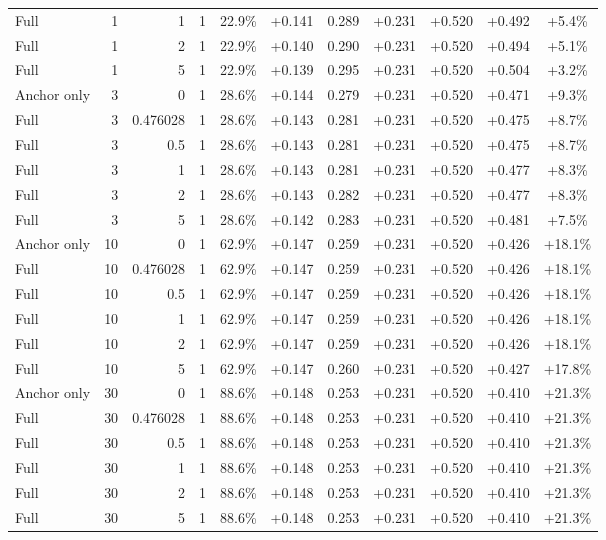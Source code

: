 \begin{table}[htbp]
\begin{tabular}{lrrrccccccc}
Full & 1 & 1 & 1 & 22.9\% & +0.141 & 0.289 & +0.231 & +0.520 & +0.492 & +5.4\% \\
Full & 1 & 2 & 1 & 22.9\% & +0.140 & 0.290 & +0.231 & +0.520 & +0.494 & +5.1\% \\
Full & 1 & 5 & 1 & 22.9\% & +0.139 & 0.295 & +0.231 & +0.520 & +0.504 & +3.2\% \\
Anchor only & 3 & 0 & 1 & 28.6\% & +0.144 & 0.279 & +0.231 & +0.520 & +0.471 & +9.3\% \\
Full & 3 & 0.476028 & 1 & 28.6\% & +0.143 & 0.281 & +0.231 & +0.520 & +0.475 & +8.7\% \\
Full & 3 & 0.5 & 1 & 28.6\% & +0.143 & 0.281 & +0.231 & +0.520 & +0.475 & +8.7\% \\
Full & 3 & 1 & 1 & 28.6\% & +0.143 & 0.281 & +0.231 & +0.520 & +0.477 & +8.3\% \\
Full & 3 & 2 & 1 & 28.6\% & +0.143 & 0.282 & +0.231 & +0.520 & +0.477 & +8.3\% \\
Full & 3 & 5 & 1 & 28.6\% & +0.142 & 0.283 & +0.231 & +0.520 & +0.481 & +7.5\% \\
Anchor only & 10 & 0 & 1 & 62.9\% & +0.147 & 0.259 & +0.231 & +0.520 & +0.426 & +18.1\% \\
Full & 10 & 0.476028 & 1 & 62.9\% & +0.147 & 0.259 & +0.231 & +0.520 & +0.426 & +18.1\% \\
Full & 10 & 0.5 & 1 & 62.9\% & +0.147 & 0.259 & +0.231 & +0.520 & +0.426 & +18.1\% \\
Full & 10 & 1 & 1 & 62.9\% & +0.147 & 0.259 & +0.231 & +0.520 & +0.426 & +18.1\% \\
Full & 10 & 2 & 1 & 62.9\% & +0.147 & 0.259 & +0.231 & +0.520 & +0.426 & +18.1\% \\
Full & 10 & 5 & 1 & 62.9\% & +0.147 & 0.260 & +0.231 & +0.520 & +0.427 & +17.8\% \\
Anchor only & 30 & 0 & 1 & 88.6\% & +0.148 & 0.253 & +0.231 & +0.520 & +0.410 & +21.3\% \\
Full & 30 & 0.476028 & 1 & 88.6\% & +0.148 & 0.253 & +0.231 & +0.520 & +0.410 & +21.3\% \\
Full & 30 & 0.5 & 1 & 88.6\% & +0.148 & 0.253 & +0.231 & +0.520 & +0.410 & +21.3\% \\
Full & 30 & 1 & 1 & 88.6\% & +0.148 & 0.253 & +0.231 & +0.520 & +0.410 & +21.3\% \\
Full & 30 & 2 & 1 & 88.6\% & +0.148 & 0.253 & +0.231 & +0.520 & +0.410 & +21.3\% \\
Full & 30 & 5 & 1 & 88.6\% & +0.148 & 0.253 & +0.231 & +0.520 & +0.410 & +21.3\% \\

\end{tabular}
\end{table}

